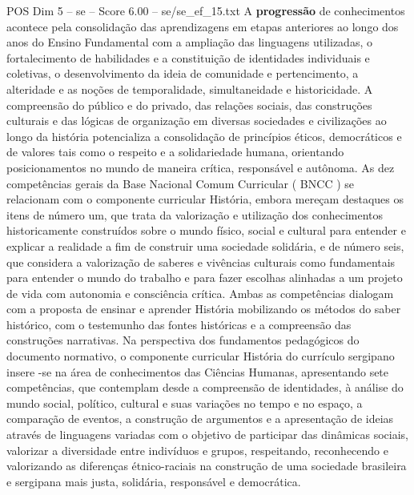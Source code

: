 \begin{textsample}{POS Dim 5 – se – Score 6.00 – se/se\_ef\_15.txt}
A \textbf{progressão} de conhecimentos acontece pela consolidação das aprendizagens em etapas anteriores ao longo dos anos do Ensino Fundamental com a ampliação das linguagens utilizadas, o fortalecimento de habilidades e a constituição de identidades individuais e coletivas, o desenvolvimento da ideia de comunidade e pertencimento, a alteridade e as noções de temporalidade, simultaneidade e historicidade.
A compreensão do público e do privado, das relações sociais, das construções culturais e das lógicas de organização em diversas sociedades e civilizações ao longo da história potencializa a consolidação de princípios éticos, democráticos e de valores tais como o respeito e a solidariedade humana, orientando posicionamentos no mundo de maneira crítica, responsável e autônoma.
As dez competências gerais da Base Nacional Comum Curricular ( BNCC ) se relacionam com o componente curricular História, embora mereçam destaques os itens de número um, que trata da valorização e utilização dos conhecimentos historicamente construídos sobre o mundo físico, social e cultural para entender e explicar a realidade a fim de construir uma sociedade solidária, e de número seis, que considera a valorização de saberes e vivências culturais como fundamentais para entender o mundo do trabalho e para fazer escolhas alinhadas a um projeto de vida com autonomia e consciência crítica.
Ambas as competências dialogam com a proposta de ensinar e aprender História mobilizando os métodos do saber histórico, com o testemunho das fontes históricas e a compreensão das construções narrativas.
Na perspectiva dos fundamentos pedagógicos do documento normativo, o componente curricular História do currículo sergipano insere -se na área de conhecimentos das Ciências Humanas, apresentando sete competências, que contemplam desde a compreensão de identidades, à análise do mundo social, político, cultural e suas variações no tempo e no espaço, a comparação de eventos, a construção de argumentos e a apresentação de ideias através de linguagens variadas com o objetivo de participar das dinâmicas sociais, valorizar a diversidade entre indivíduos e grupos, respeitando, reconhecendo e valorizando as diferenças étnico-raciais na construção de uma sociedade brasileira e sergipana mais justa, solidária, responsável e democrática.

\end{textsample}

